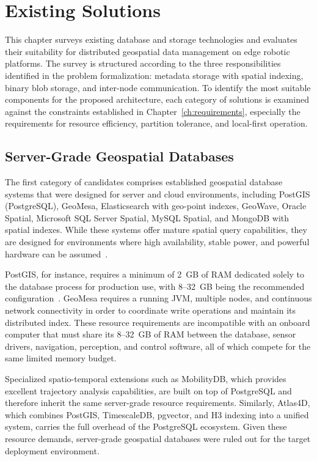 
\chapter{Existing Solutions} \label{ch:existing-solutions}

This chapter surveys existing database and storage technologies and evaluates their suitability for distributed geospatial data management on edge robotic platforms. The survey is structured according to the three responsibilities identified in the problem formalization: metadata storage with spatial indexing, binary blob storage, and inter-node communication. To identify the most suitable components for the proposed architecture, each category of solutions is examined against the constraints established in Chapter~\ref{ch:requirements}, especially the requirements for resource efficiency, partition tolerance, and local-first operation.


\section{Server-Grade Geospatial Databases} \label{sec:server-grade-databases}

The first category of candidates comprises established geospatial database systems that were designed for server and cloud environments, including PostGIS (PostgreSQL), GeoMesa, Elasticsearch with geo-point indexes, GeoWave, Oracle Spatial, Microsoft SQL Server Spatial, MySQL Spatial, and MongoDB with spatial indexes. While these systems offer mature spatial query capabilities, they are designed for environments where high availability, stable power, and powerful hardware can be assumed~\cite{garcia2024computational}.

PostGIS, for instance, requires a minimum of 2~GB of RAM dedicated solely to the database process for production use, with 8--32~GB being the recommended configuration~\cite{postgis2024admin}. GeoMesa requires a running JVM, multiple nodes, and continuous network connectivity in order to coordinate write operations and maintain its distributed index. These resource requirements are incompatible with an onboard computer that must share its 8--32~GB of RAM between the database, sensor drivers, navigation, perception, and control software, all of which compete for the same limited memory budget.

Specialized spatio-temporal extensions such as MobilityDB, which provides excellent trajectory analysis capabilities, are built on top of PostgreSQL and therefore inherit the same server-grade resource requirements. Similarly, Atlas4D, which combines PostGIS, TimescaleDB, pgvector, and H3 indexing into a unified system, carries the full overhead of the PostgreSQL ecosystem. Given these resource demands, server-grade geospatial databases were ruled out for the target deployment environment.


